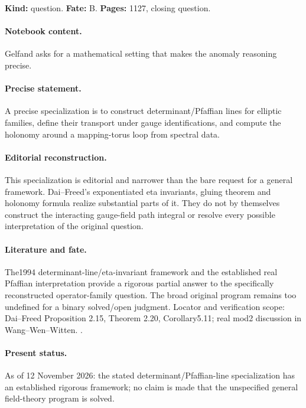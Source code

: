 \label{item:1983-604.10}

\noindent\textbf{Kind:} question. \textbf{Fate:} B. \textbf{Pages:} 1127, closing question.\par

\paragraph{Notebook content.} Gelfand asks for a mathematical setting that makes the anomaly reasoning precise.

\paragraph{Precise statement.} A precise specialization is to construct determinant/Pfaffian lines for elliptic families, define their transport under gauge identifications, and compute the holonomy around a mapping-torus loop from spectral data.

\paragraph{Editorial reconstruction.} This specialization is editorial and narrower than the bare request for a general framework. Dai--Freed's exponentiated eta invariants, gluing theorem and holonomy formula realize substantial parts of it. They do not by themselves construct the interacting gauge-field path integral or resolve every possible interpretation of the original question.

\paragraph{Literature and fate.} The1994 determinant-line/eta-invariant framework and the established real Pfaffian interpretation provide a rigorous partial answer to the specifically reconstructed operator-family question. The broad original program remains too undefined for a binary solved/open judgment. Locator and verification scope: Dai--Freed Proposition 2.15, Theorem 2.20, Corollary5.11; real mod2 discussion in Wang--Wen--Witten. \cite{daifreed1994eta,wangwenwitten2019new}.

\paragraph{Present status.} As of 12 November 2026: the stated determinant/Pfaffian-line specialization has an established rigorous framework; no claim is made that the unspecified general field-theory program is solved.

